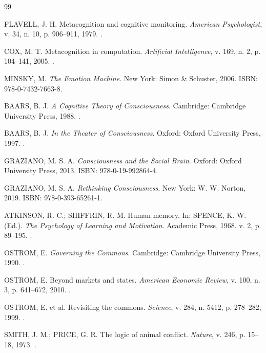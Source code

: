 \begin{thebibliography}{99}

FLAVELL, J. H. Metacognition and cognitive monitoring. \textit{American Psychologist}, v. 34, n. 10, p. 906--911, 1979. .

COX, M. T. Metacognition in computation. \textit{Artificial Intelligence}, v. 169, n. 2, p. 104--141, 2005. .

MINSKY, M. \textit{The Emotion Machine}. New York: Simon \& Schuster, 2006. ISBN: 978-0-7432-7663-8.

BAARS, B. J. \textit{A Cognitive Theory of Consciousness}. Cambridge: Cambridge University Press, 1988. .

BAARS, B. J. \textit{In the Theater of Consciousness}. Oxford: Oxford University Press, 1997. .

GRAZIANO, M. S. A. \textit{Consciousness and the Social Brain}. Oxford: Oxford University Press, 2013. ISBN: 978-0-19-992864-4.

GRAZIANO, M. S. A. \textit{Rethinking Consciousness}. New York: W. W. Norton, 2019. ISBN: 978-0-393-65261-1.

ATKINSON, R. C.; SHIFFRIN, R. M. Human memory. In: SPENCE, K. W. (Ed.). \textit{The Psychology of Learning and Motivation}. Academic Press, 1968. v. 2, p. 89--195. .

OSTROM, E. \textit{Governing the Commons}. Cambridge: Cambridge University Press, 1990. .

OSTROM, E. Beyond markets and states. \textit{American Economic Review}, v. 100, n. 3, p. 641--672, 2010. .

OSTROM, E. et al. Revisiting the commons. \textit{Science}, v. 284, n. 5412, p. 278--282, 1999. .

SMITH, J. M.; PRICE, G. R. The logic of animal conflict. \textit{Nature}, v. 246, p. 15--18, 1973. .


\end{thebibliography}
